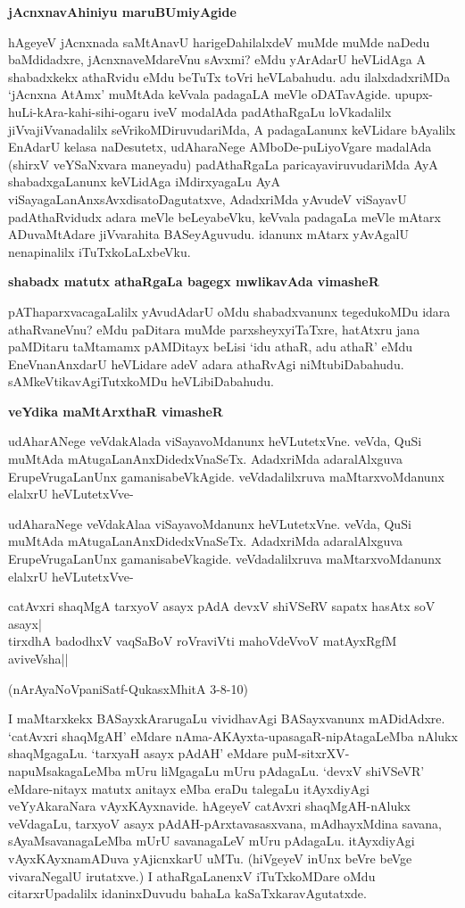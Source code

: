 \noindent
\textbf{jAcnxnavAhiniyu maruBUmiyAgide}\label{page110}

hAgeyeV jAcnxnada saMtAnavU harigeDahilalxdeV muMde muMde naDedu 
baMdidadxre, jAcnxnaveMdareVnu sAvxmi? eMdu yArAdarU heVLidAga A 
shabadxkekx athaRvidu eMdu beTuTx toVri heVLabahudu. adu ilalxdadxriMDa 
`jAcnxna AtAmx' muMtAda keVvala padagaLA meVle oDATavAgide. 
upupx-huLi-kAra-kahi-sihi-ogaru iveV modalAda padAthaRgaLu loVkadalilx 
jiVvajiVvanadalilx seVrikoMDiruvudariMda, A padagaLanunx keVLidare bAyalilx EnAdarU kelasa naDesutetx, udAharaNege AMboDe-puLiyoVgare madalA\-da (shirxV veYSaNxvara maneyadu) padAthaRgaLa paricayaviruvudariMda AyA shabadxgaLanunx keVLidAga iMdirxyagaLu AyA viSayagaLanAnxsAvxdisatoDagutatxve, AdadxriMda yAvudeV viSayavU padAthaRvidudx adara meVle beLeyabeVku, keVvala padagaLa meVle mAtarx ADuvaMtAdare jiVvarahita BASeyAguvudu. idanunx mAtarx yAvAgalU nenapinalilx iTuTxkoLaLxbeVku.

\noindent
\textbf{shabadx matutx athaRgaLa bagegx mwlikavAda vimasheR}\label{page111}

pAThaparxvacagaLalilx yAvudAdarU oMdu shabadxvanunx tegedukoMDu idara 
athaRvaneVnu? eMdu paDitara muMde parxsheyxyiTaTxre, hatAtxru jana paMDitaru taMtamamx pAMDitayx beLisi `idu athaR, adu athaR' eMdu EneVnanAnxdarU heVLidare adeV adara athaRvAgi niMtubiDabahudu. sAMkeVtikavAgiTutxkoMDu heVLibiDabahudu.

\noindent
\textbf{veYdika maMtArxthaR vimasheR}\label{page111}

udAharANege veVdakAlada viSayavoMdanunx heVLutetxVne. veVda, QuSi 
muMtAda mAtugaLanAnxDidedxVnaSeTx. AdadxriMda adaralAlxguva 
ErupeVrugaLanUnx gamanisabeVkAgide. veVdadalilxruva maMtarxvoMdanunx elalxrU heVLutetxVve-

udAharaNege veVdakAlaa viSayavoMdanunx heVLutetxVne. veVda, QuSi muMtAda mAtugaLanAnxDidedxVnaSeTx. AdadxriMda adaralAlxguva ErupeVrugaLanUnx gamanisabeVkagide. veVdadalilxruva maMtarxvoMdanunx elalxrU heVLutetxVve-

\begin{shloka}
catAvxri shaqMgA tarxyoV asayx pAdA devxV shiVSeRV sapatx hasAtx soV asayx|\\\label{111}
tirxdhA badodhxV vaqSaBoV roVraviVti mahoVdeVvoV matAyxRgfM aviveVsha||
\end{shloka}

(nArAyaNoVpaniSatf-QukasxMhitA 3-8-10)

I maMtarxkekx BASayxkArarugaLu vividhavAgi BASayxvanunx mADidAdxre. 
`catAvxri shaqMgAH' eMdare nAma-AKAyxta-upasagaR-nipAtagaLeMba nAlukx 
shaqMgagaLu. `tarxyaH asayx pAdAH' eMdare puM-sitxrXV-napuMsakagaLeMba 
mUru liMgagaLu mUru pAdagaLu. `devxV shiVSeVR' eMdare-nitayx matutx 
anitayx eMba eraDu talegaLu itAyxdiyAgi veYyAkaraNara vAyxKAyxnavide. hAgeyeV catAvxri shaqMgAH-nAlukx veVdagaLu, tarxyoV asayx pAdAH-pArxtavasasxvana, mAdhayxMdina savana, sAyaMsavanagaLeMba mUrU savanagaLeV mUru pAdagaLu. itAyxdiyAgi vAyxKAyxnamADuva yAjicnxkarU uMTu. (hiVgeyeV inUnx beVre beVge vivaraNegalU irutatxve.) I athaRgaLanenxV iTuTxkoMDare oMdu citarxrUpadalilx idaninxDuvudu bahaLa kaSaTxkaravAgutatxde.


